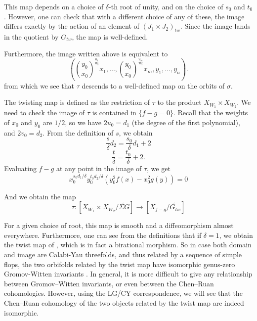 \documentclass[10pt, letterpaper]{amsart}
\theoremstyle{remark}
\newcommand{\tw}[1]{{#1}_{tw}}
\newcommand{\s}[1]{\Sigma #1}
\newcommand{\nathan}[1]{\todo[color=pistachio,fancyline]{N:#1}}
\begin{document}
This map depends on a choice of $\delta$-th root of unity, and on the choice of $s_0$ and $t_0$. However, one can check that with a different choice of any of these, the image differs exactly by the action of an element of $\tw{(J_1\times J_2)}$. Since the image lands in the quotient by $\tw{G}$, the map is well-defined.


Furthermore, the image written above is equivalent to 
\[
((\frac{y_0}{x_0})^{\frac{u_1}{u_0}}x_1, \ldots, (\frac{y_0}{x_0})^{\frac{u_m}{u_0}}x_m, y_1, \ldots, y_n).
\]
from which we see that $\tau$ descends to a well-defined map on the orbits of $\sigma$. 

The twisting map is defined as the restriction of $\tau$ to the product $X_{W_1}\times X_{W_2}$. We need to check the image of $\tau$ is contained in  $\{f-g=0\}$. Recall that the weights of $x_0$ and $y_0$ are $1/2$, so we have $2u_0=d_1$ (the degree of the first polynomial), and $2v_0=d_2$. From the definition of $s$, we obtain
\[
\frac s\delta d_2=\frac{s_0}{\delta}d_1+2 
\]
\[
\frac t\delta=\frac{t_0}{\delta}+2. 
\]
Evaluating $f-g$ at any point in the image of $\tau$, we get 
\[
x_0^{s_0d_1/\delta}y_0^{t_0d_2/\delta}(y_0^{2}f(x)-x_0^2g(y))=0 
\]

And we obtain the map 
\[
\tau:[X_{W_1}\times X_{W_2}/\widetilde{\s{G}}]\to [X_{f-g}/\widetilde{\tw{G}}]
\]


For a given choice of root, this map is smooth and a diffeomorphism almost everywhere. Furthermore, one can see from the definitions that if $\delta=1$, we obtain the twist map of \cite{ABS}, which is in fact a birational morphism.  %
So in case both domain and image are Calabi-Yau threefolds, and thus related by a sequence of simple flops, the two orbifolds related by the twist map have isomorphic genus-zero Gromov-Witten invariants \nathan{citation?}. In general, it is more difficult to give any relationship between Gromov--Witten invariants, or even between the Chen--Ruan cohomologies. However, using the LG/CY correspondence, we will see that the Chen--Ruan cohomology of the two objects related by the twist map are indeed isomorphic. 
\end{document}
